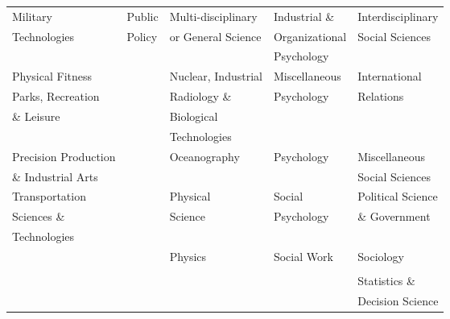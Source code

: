 \documentclass[11pt]{article}
\theoremstyle{definition}
\begin{document}
\begin{center}
\begin{tabular}{|l| l| l| l |l|}
  \hline \rowcolor{Gray}
Military & Public & Multi-disciplinary & Industrial \& & Interdisciplinary \\
\rowcolor{Gray}
Technologies & Policy & or General Science & Organizational & Social Sciences\\
\rowcolor{Gray}
 & & & Psychology & \\
  \hline
Physical Fitness &   & Nuclear, Industrial & Miscellaneous & International \\
Parks, Recreation &  & Radiology \& & Psychology & Relations \\
\& Leisure & & Biological & & \\
 & & Technologies & & \\
  \hline \rowcolor{Gray}
Precision Production &  & Oceanography & Psychology & Miscellaneous \\
\rowcolor{Gray}
 \& Industrial Arts & & & & Social Sciences\\
  \hline
Transportation & & Physical & Social & Political Science\\
Sciences \& &  & Science & Psychology & \& Government \\
Technologies & & & & \\ 
  \hline \rowcolor{Gray}
& & Physics & Social Work & Sociology\\
 \rowcolor{Gray}
  &  &  &  & \\
 \hline 
 &  & &  & Statistics \&\\
  &  &  &  & Decision Science \\
 \hline\hline
\end{tabular} 
\endgroup
\end{center}
\end{document}
